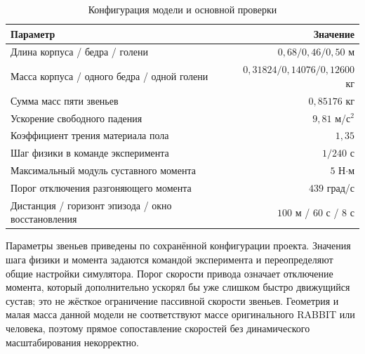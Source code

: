 \documentclass[11pt,a4paper]{article}
\begin{document}
\begin{table}[htbp]\centering\small
\caption{Конфигурация модели и основной проверки}
\begin{tabularx}{\textwidth}{@{}Xr@{}}\toprule
Параметр & Значение \\\midrule
Длина корпуса / бедра / голени & $0{,}68 / 0{,}46 / 0{,}50$ м \\
Масса корпуса / одного бедра / одной голени & $0{,}31824 / 0{,}14076 / 0{,}12600$ кг \\
Сумма масс пяти звеньев & $0{,}85176$ кг \\
Ускорение свободного падения & $9{,}81$ м/с$^2$ \\
Коэффициент трения материала пола & $1{,}35$ \\
Шаг физики в команде эксперимента & $1/240$ с \\
Максимальный модуль суставного момента & $5$ Н$\cdot$м \\
Порог отключения разгоняющего момента & $439$ град/с \\
Дистанция / горизонт эпизода / окно восстановления & $100$ м / $60$ с / $8$ с \\\bottomrule
\end{tabularx}
\label{tab:settings}
\end{table}

Параметры звеньев приведены по сохранённой конфигурации проекта. Значения шага физики и момента задаются командой эксперимента и переопределяют общие настройки симулятора. Порог скорости привода означает отключение момента, который дополнительно ускорял бы уже слишком быстро движущийся сустав; это не жёсткое ограничение пассивной скорости звеньев. Геометрия и малая масса данной модели не соответствуют массе оригинального RABBIT или человека, поэтому прямое сопоставление скоростей без динамического масштабирования некорректно.
\end{document}
